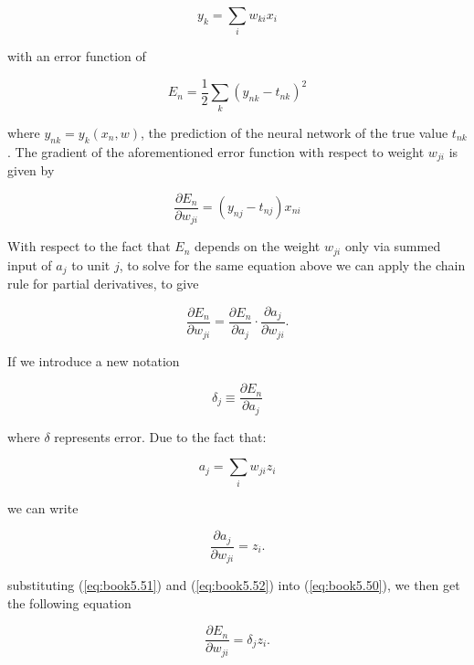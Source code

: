 \documentclass[ %
                    author={Revalda Putawara},
                supervisor={Dr. James Pope},
                    degree={MSc},
                     title={Robustness of Bayesian Neural Networks Design Choices Against Weight and Bias Perturbation Induced by Single Event Upsets (SEUs)},
                      type={},
                      year={2025}]{dissertation}
\begin{document}
\begin{equation}
y_k = \sum_i w_{ki} x_i
\end{equation}

with an error function of

\begin{equation} \label{eq:book5.48}
E_n = \frac{1}{2} \sum_k (y_{nk} - t_{nk})^2
\end{equation}

where $y_{nk}=y_k(x_n,w)$, the prediction of the neural network of the true value $t_{nk}$. The gradient of the aforementioned error function with respect to weight $w_{ji}$ is given by

\begin{equation} \label{eq:book5.49}
\frac{\partial E_n}{\partial w_{ji}} = (y_{nj} - t_{nj}) x_{ni}
\end{equation}

With respect to the fact that $E_{n}$ depends on the weight $w_{ji}$ only via summed input of $a_j$ to unit $j$, to solve for the same equation above we can apply the chain rule for partial derivatives, to give

\begin{equation} \label{eq:book5.50}
\frac{\partial E_n}{\partial w_{ji}} = \frac{\partial E_n}{\partial a_j} \cdot \frac{\partial a_j}{\partial w_{ji}}.
\end{equation}

If we introduce a new notation

\begin{equation} \label{eq:book5.51}
\delta_j \equiv \frac{\partial E_n}{\partial a_j}
\end{equation}

where $\delta$ represents error. Due to the fact that:

\begin{equation} \label{eq:book5.52}
a_j = \sum_i w_{ji} z_i
\end{equation}

we can write 

\begin{equation}
\frac{\partial a_j}{\partial w_{ji}} = z_i.
\end{equation}

substituting (\ref{eq:book5.51}) and (\ref{eq:book5.52}) into (\ref{eq:book5.50}), we then get the following equation

\begin{equation}
\frac{\partial E_n}{\partial w_{ji}} = \delta_j z_i.
\end{equation}
\end{document}
